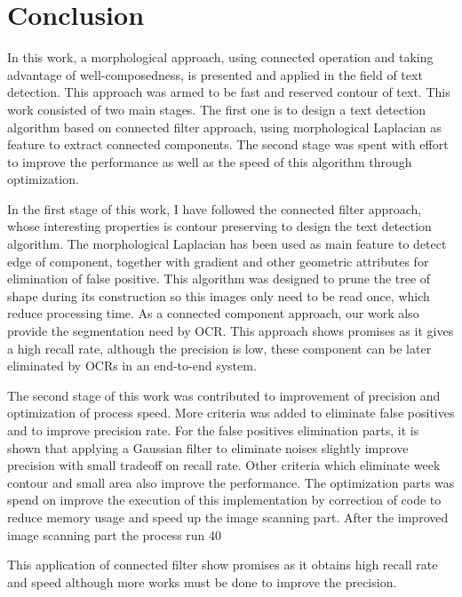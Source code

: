 
\graphicspath{ {7chapterConclusion/image/} }
\chapter{Conclusion}


In this work, a morphological approach, using connected operation and taking advantage of well-composedness, is presented and applied in the field of text detection. This approach was armed to be fast and reserved contour of text. This work consisted of two main stages. The first one is to design a text detection algorithm based on connected filter approach, using morphological Laplacian as feature to extract connected components. The second stage was spent with effort to improve the performance as well as the speed of this algorithm through optimization. 

In the first stage of this work, I have followed the connected filter approach, whose interesting properties is contour preserving to design the text detection algorithm. The morphological Laplacian has been used as main feature to detect edge of component, together with gradient and other geometric attributes for elimination of false positive. This algorithm was designed to prune the tree of shape during its construction so this images only need to be read once, which reduce processing time. As a connected component approach, our work also provide the segmentation need by OCR. This approach shows promises as it gives a high recall rate, although the precision is low, these component can be later eliminated by OCRs in an end-to-end system.
  

The second stage of this work was contributed to improvement of precision and optimization of process speed. More criteria was added to eliminate false positives and to improve precision rate. For the false positives elimination parts, it is shown that applying a Gaussian filter to eliminate noises slightly improve precision with small tradeoff on recall rate. Other criteria which eliminate week contour and small area also improve the performance. The optimization parts was spend on improve the execution of this implementation by correction of code to reduce memory usage and speed up the image scanning part. After the improved image scanning part the process run 40%

This application of connected filter show promises as it obtains high recall rate and speed although more works must be done to improve the precision.
